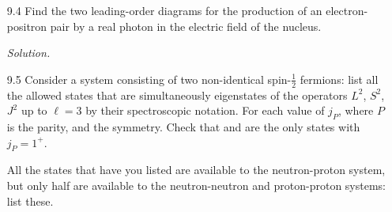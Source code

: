 \documentclass{homework}
\newcommand{\solution}{	\vspace{1em} \textit{Solution.} \quad }
\begin{document}
\begin{enumerate}
			\vspace{2em}
			
		\item[9.4] %
			Find the two leading-order diagrams for the production of an electron-positron pair by a real photon in the electric field of the nucleus.
			
			\solution 
			
			\hfil
			\hfil
			\hfil
			
			\pagebreak
			
		\item[9.5] %
			Consider a system consisting of two non-identical spin-$\frac{1}{2}$ fermions: list all the allowed states that are simultaneously eigenstates of the operators $L^2$, $S^2$, $J^2$ up to $\ell=3$ by their spectroscopic notation. For each value of $j_P$, where $P$ is the parity, and the symmetry. Check that  and  are the only states with $j_P=1^+$.
			
			All the states that have you listed are available to the neutron-proton system, but only half are available to the neutron-neutron and proton-proton systems: list these.
			

\end{enumerate}
\end{document}
